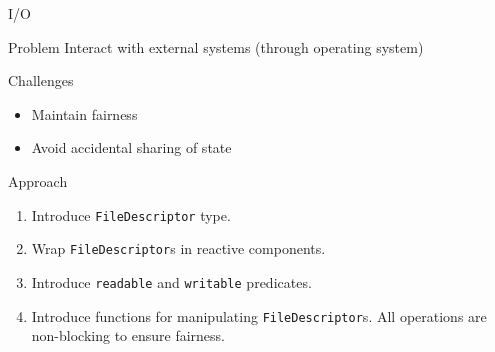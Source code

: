 \documentclass{beamer}
\begin{document}





\begin{frame}[fragile]{I/O}
  \begin{block}{Problem}
    Interact with external systems (through operating system)
  \end{block}

  \begin{block}{Challenges}
    \begin{itemize}
      \item Maintain fairness
      \item Avoid accidental sharing of state
    \end{itemize}
  \end{block}

  \begin{block}{Approach}
    \begin{enumerate}
    \item Introduce \verb+FileDescriptor+ type.
    \item Wrap \verb+FileDescriptor+s in reactive components.
    \item Introduce \verb+readable+ and \verb+writable+ predicates.
    \item Introduce functions for manipulating \verb+FileDescriptor+s.  All operations are non-blocking to ensure fairness.
    \end{enumerate}
  \end{block}
\end{frame}
\end{document}
